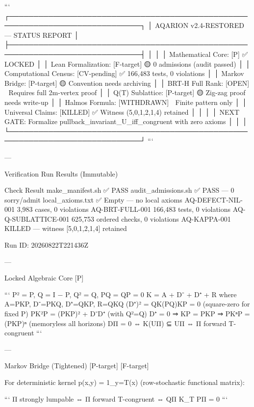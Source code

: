 ```
┌─────────────────────────────────────────────────────────────────────────────┐
│  AQARION v2.4-RESTORED — STATUS REPORT                                     │
├─────────────────────────────────────────────────────────────────────────────┤
│                                                                             │
│  Mathematical Core:        [P] ✅ LOCKED                                   │
│  Lean Formalization:       [F-target] 🟡 0 admissions (audit passed)       │
│  Computational Census:     [CV-pending] ✅ 166,483 tests, 0 violations     │
│  Markov Bridge:            [P-target] 🟡 Convention needs archiving        │
│  BRT-H Full Rank:          [OPEN] 🔴 Requires full 2m-vertex proof         │
│  Q(T) Sublattice:          [P-target] 🟡 Zig-zag proof needs write-up      │
│  Halmos Formula:           [WITHDRAWN] 🔴 Finite pattern only              │
│  Universal Claims:         [KILLED] ✅ Witness (5,0,1,2,1,4) retained      │
│                                                                             │
│  NEXT GATE: Formalize pullback_invariant_U_iff_congruent with zero axioms  │
│                                                                             │
└─────────────────────────────────────────────────────────────────────────────┘
```

---

Verification Run Results (Immutable)

Check Result
make_manifest.sh ✅ PASS
audit_admissions.sh ✅ PASS — 0 sorry/admit
local_axioms.txt ✅ Empty — no local axioms
AQ-DEFECT-NIL-001 3,983 cases, 0 violations
AQ-BRT-FULL-001 166,483 tests, 0 violations
AQ-Q-SUBLATTICE-001 625,753 ordered checks, 0 violations
AQ-KAPPA-001 KILLED — witness [5,0,1,2,1,4] retained

Run ID: 20260822T221436Z

---

Locked Algebraic Core [P]

```
P² = P, Q = I − P, Q² = Q, PQ = QP = 0
K = A + D⁻ + D⁺ + R    where A=PKP, D⁻=PKQ, D⁺=QKP, R=QKQ
(D⁺)² = QK(PQ)KP = 0   (square-zero for fixed P)
PK²P = (PKP)² + D⁻D⁺   (with Q²=Q)
D⁺ = 0 ⇒ KP = PKP ⇒ PKⁿP = (PKP)ⁿ   (memoryless all horizons)
DΠ = 0 ⇔ K(UΠ) ⊆ UΠ ⇔ Π forward T-congruent
```

---

Markov Bridge (Tightened) [P-target] [F-target]

For deterministic kernel p(x,y) = 1_{y=T(x)} (row-stochastic functional matrix):

```
Π strongly lumpable ⇔ Π forward T-congruent ⇔ QΠ K_T PΠ = 0
```

